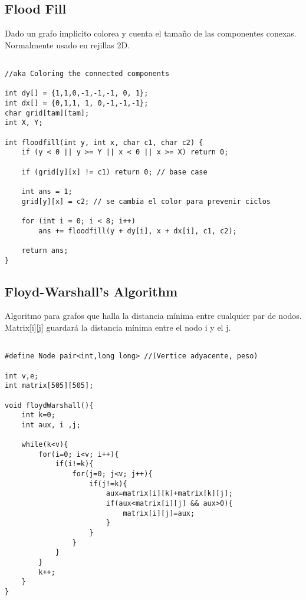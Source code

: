\documentclass[11pt,letterpaper,twocolumn,twosided]{article}
\begin{document}
\subsection{Flood Fill}
Dado un grafo implicito colorea y cuenta el tama\~no de las componentes conexas. Normalmente usado en rejillas 2D.
\begin{lstlisting}

//aka Coloring the connected components

int dy[] = {1,1,0,-1,-1,-1, 0, 1}; 
int dx[] = {0,1,1, 1, 0,-1,-1,-1};
char grid[tam][tam];
int X, Y;

int floodfill(int y, int x, char c1, char c2) { 
	if (y < 0 || y >= Y || x < 0 || x >= X) return 0;
	
	if (grid[y][x] != c1) return 0; // base case
	
	int ans = 1; 
	grid[y][x] = c2; // se cambia el color para prevenir ciclos
	
	for (int i = 0; i < 8; i++)
		ans += floodfill(y + dy[i], x + dx[i], c1, c2);
	
	return ans;
}
\end{lstlisting}

\subsection{Floyd-Warshall's Algorithm}
Algoritmo para grafos que halla la distancia m\'inima entre cualquier par de nodos. Matrix[i][j] guardar\'a la distancia m\'inima entre el nodo i y el j.
\begin{lstlisting}

#define Node pair<int,long long> //(Vertice adyacente, peso)

int v,e;
int matrix[505][505];

void floydWarshall(){
    int k=0;
    int aux, i ,j;
    
    while(k<v){
        for(i=0; i<v; i++){
            if(i!=k){
                for(j=0; j<v; j++){
                    if(j!=k){
                        aux=matrix[i][k]+matrix[k][j];
                        if(aux<matrix[i][j] && aux>0){ 
                            matrix[i][j]=aux;
                        }
                    }
                }
            }
        }
        k++;
    }
}\end{lstlisting}
\end{document}
